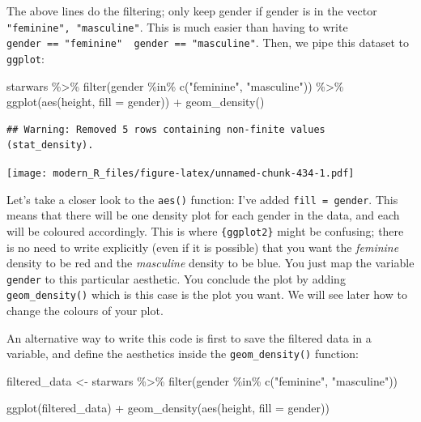 \documentclass[
]{article}
\newenvironment{Shaded}{\begin{snugshade}}{\end{snugshade}}
\newcommand{\AttributeTok}[1]{\textcolor[rgb]{0.77,0.63,0.00}{#1}}
\newcommand{\FunctionTok}[1]{\textcolor[rgb]{0.00,0.00,0.00}{#1}}
\newcommand{\NormalTok}[1]{#1}
\newcommand{\OtherTok}[1]{\textcolor[rgb]{0.56,0.35,0.01}{#1}}
\newcommand{\SpecialCharTok}[1]{\textcolor[rgb]{0.00,0.00,0.00}{#1}}
\newcommand{\StringTok}[1]{\textcolor[rgb]{0.31,0.60,0.02}{#1}}
\begin{document}
The above lines do the filtering; only keep gender if gender is in the vector \texttt{"feminine",\ "masculine"}.
This is much easier than having to write \texttt{gender\ ==\ "feminine"\ \textbar{}\ gender\ ==\ "masculine"}. Then, we pipe
this dataset to \texttt{ggplot}:

\begin{Shaded}
\begin{Highlighting}[]
\NormalTok{starwars }\SpecialCharTok{\%\textgreater{}\%}
  \FunctionTok{filter}\NormalTok{(gender }\SpecialCharTok{\%in\%} \FunctionTok{c}\NormalTok{(}\StringTok{"feminine"}\NormalTok{, }\StringTok{"masculine"}\NormalTok{)) }\SpecialCharTok{\%\textgreater{}\%}
  \FunctionTok{ggplot}\NormalTok{(}\FunctionTok{aes}\NormalTok{(height, }\AttributeTok{fill =}\NormalTok{ gender)) }\SpecialCharTok{+}
  \FunctionTok{geom\_density}\NormalTok{()}
\end{Highlighting}
\end{Shaded}

\begin{verbatim}
## Warning: Removed 5 rows containing non-finite values (stat_density).
\end{verbatim}

\texttt{[image: modern\_R\_files/figure-latex/unnamed-chunk-434-1.pdf]}

Let's take a closer look to the \texttt{aes()} function: I've added \texttt{fill\ =\ gender}. This means that
there will be one density plot for each gender in the data, and each will be coloured accordingly.
This is where \texttt{\{ggplot2\}} might be confusing; there is no need to write explicitly (even if it is
possible) that you want the \emph{feminine} density to be red and the \emph{masculine} density to be blue. You just
map the variable \texttt{gender} to this particular aesthetic. You conclude the plot by adding
\texttt{geom\_density()} which is this case is the plot you want. We will see later how to change the
colours of your plot.

An alternative way to write this code is first to save the filtered data in a variable, and define
the aesthetics inside the \texttt{geom\_density()} function:

\begin{Shaded}
\begin{Highlighting}[]
\NormalTok{filtered\_data }\OtherTok{\textless{}{-}}\NormalTok{ starwars }\SpecialCharTok{\%\textgreater{}\%}
  \FunctionTok{filter}\NormalTok{(gender }\SpecialCharTok{\%in\%} \FunctionTok{c}\NormalTok{(}\StringTok{"feminine"}\NormalTok{, }\StringTok{"masculine"}\NormalTok{))}

\FunctionTok{ggplot}\NormalTok{(filtered\_data) }\SpecialCharTok{+}
  \FunctionTok{geom\_density}\NormalTok{(}\FunctionTok{aes}\NormalTok{(height, }\AttributeTok{fill =}\NormalTok{ gender))}
\end{Highlighting}
\end{Shaded}
\end{document}
